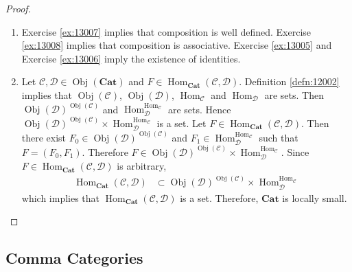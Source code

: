 \documentclass{book}
\theoremstyle{definition}
\newcommand{\MC}{\mathcal{C}}
\newcommand{\MD}{\mathcal{D}}
\newcommand{\rex}[1]{Exercise \ref{ex:#1}}
\newcommand{\rd}[1]{Definition \ref{defn:#1}}
\DeclareMathOperator{\Obj}{Obj}
\DeclareMathOperator{\Hom}{Hom}
\DeclareMathOperator*{\0}{\mbf{0}}
\DeclareMathOperator*{\1}{\mbf{1}}
\newcommand{\tbf}[1]{\textbf{#1}}
\begin{document}
	\begin{proof}\
		\begin{enumerate}
			\item \rex{13007} implies that composition is well defined. \rex{13008} implies that composition is associative. \rex{13005} and \rex{13006} imply the existence of identities.
			\item Let $\MC, \MD \in \Obj(\tbf{Cat})$ and $F \in \Hom_{\tbf{Cat}}(\MC, \MD)$. \rd{12002} implies that $\Obj(\MC)$, $\Obj(\MD)$, $\Hom_{\MC}$ and $\Hom_{\MD}$ are sets. Then $\Obj(\MD)^{\Obj(\MC)}$ and $\Hom_{\MD}^{ \Hom_{\MC}}$ are sets. Hence $ \Obj(\MD)^{\Obj(\MC)} \times  \Hom_{\MD}^{ \Hom_{\MC}}$ is a set. Let $F \in \Hom_{\tbf{Cat}}(\MC, \MD)$. Then there exist $F_0 \in \Obj(\MD)^{\Obj(\MC)} $ and $F_1 \in \Hom_{\MD}^{ \Hom_{\MC}}$ such that $F = (F_0, F_1)$. Therefore $F \in  \Obj(\MD)^{\Obj(\MC)} \times  \Hom_{\MD}^{ \Hom_{\MC}}$. Since $F \in \Hom_{\tbf{Cat}}(\MC, \MD)$ is arbitrary, 
			\begin{align*}
				\Hom_{\tbf{Cat}}(\MC, \MD) 
				& \subset \Obj(\MD)^{\Obj(\MC)} \times  \Hom_{\MD}^{ \Hom_{\MC}}
			\end{align*}
			which implies that $\Hom_{\tbf{Cat}}(\MC, \MD)$ is a set. Therefore, $\tbf{Cat}$ is locally small.
		\end{enumerate} 
	\end{proof}















	\subsection{Comma Categories}
\end{document}
